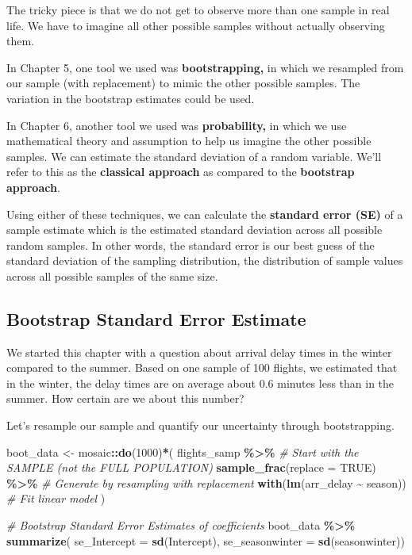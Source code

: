 \documentclass[
]{book}
\newenvironment{Shaded}{\begin{snugshade}}{\end{snugshade}}
\newcommand{\AttributeTok}[1]{\textcolor[rgb]{0.13,0.29,0.53}{#1}}
\newcommand{\CommentTok}[1]{\textcolor[rgb]{0.56,0.35,0.01}{\textit{#1}}}
\newcommand{\ConstantTok}[1]{\textcolor[rgb]{0.56,0.35,0.01}{#1}}
\newcommand{\DecValTok}[1]{\textcolor[rgb]{0.00,0.00,0.81}{#1}}
\newcommand{\FunctionTok}[1]{\textcolor[rgb]{0.13,0.29,0.53}{\textbf{#1}}}
\newcommand{\NormalTok}[1]{#1}
\newcommand{\OtherTok}[1]{\textcolor[rgb]{0.56,0.35,0.01}{#1}}
\newcommand{\SpecialCharTok}[1]{\textcolor[rgb]{0.81,0.36,0.00}{\textbf{#1}}}
\begin{document}
The tricky piece is that we do not get to observe more than one sample in real life. We have to imagine all other possible samples without actually observing them.

In Chapter 5, one tool we used was \textbf{bootstrapping,} in which we resampled from our sample (with replacement) to mimic the other possible samples. The variation in the bootstrap estimates could be used.

In Chapter 6, another tool we used was \textbf{probability,} in which we use mathematical theory and assumption to help us imagine the other possible samples. We can estimate the standard deviation of a random variable. We'll refer to this as the \textbf{classical approach} as compared to the \textbf{bootstrap approach}.

Using either of these techniques, we can calculate the \textbf{standard error (SE)} of a sample estimate which is the estimated standard deviation across all possible random samples. In other words, the standard error is our best guess of the standard deviation of the sampling distribution, the distribution of sample values across all possible samples of the same size.

\subsection{Bootstrap Standard Error Estimate}\label{bootstrap-standard-error-estimate}

We started this chapter with a question about arrival delay times in the winter compared to the summer. Based on one sample of 100 flights, we estimated that in the winter, the delay times are on average about 0.6 minutes less than in the summer. How certain are we about this number?

Let's resample our sample and quantify our uncertainty through bootstrapping.

\begin{Shaded}
\begin{Highlighting}[]
\NormalTok{boot\_data }\OtherTok{\textless{}{-}}\NormalTok{ mosaic}\SpecialCharTok{::}\FunctionTok{do}\NormalTok{(}\DecValTok{1000}\NormalTok{)}\SpecialCharTok{*}\NormalTok{( }
\NormalTok{    flights\_samp }\SpecialCharTok{\%\textgreater{}\%} \CommentTok{\# Start with the SAMPLE (not the FULL POPULATION)}
      \FunctionTok{sample\_frac}\NormalTok{(}\AttributeTok{replace =} \ConstantTok{TRUE}\NormalTok{) }\SpecialCharTok{\%\textgreater{}\%} \CommentTok{\# Generate by resampling with replacement}
      \FunctionTok{with}\NormalTok{(}\FunctionTok{lm}\NormalTok{(arr\_delay }\SpecialCharTok{\textasciitilde{}}\NormalTok{ season)) }\CommentTok{\# Fit linear model}
\NormalTok{)}


\CommentTok{\# Bootstrap Standard Error Estimates of coefficients}
\NormalTok{boot\_data }\SpecialCharTok{\%\textgreater{}\%} 
    \FunctionTok{summarize}\NormalTok{(}
        \AttributeTok{se\_Intercept =} \FunctionTok{sd}\NormalTok{(Intercept),}
        \AttributeTok{se\_seasonwinter =} \FunctionTok{sd}\NormalTok{(seasonwinter))}
\end{Highlighting}
\end{Shaded}
\end{document}

